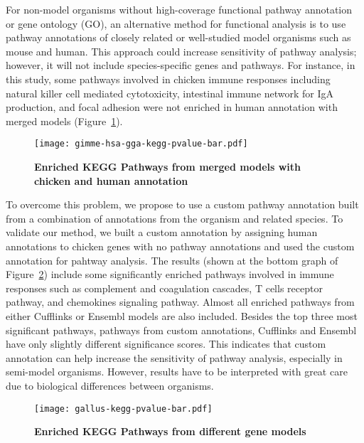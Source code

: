 For non-model organisms without high-coverage functional
pathway annotation or gene ontology (GO), an alternative
method for functional analysis is to use pathway annotations
of closely related or well-studied model organisms such as
mouse and human.  This approach could increase
sensitivity of pathway analysis; however, it will not
include species-specific genes and pathways.  For instance,
in this study, some pathways involved in chicken immune
responses including natural killer cell mediated
cytotoxicity, intestinal immune network for IgA production,
and focal adhesion were not enriched in human annotation
with merged models (Figure~\ref{gimme_hs_ga}).

\begin{figure}[!ht]
    \begin{center}
        \texttt{[image: gimme-hsa-gga-kegg-pvalue-bar.pdf]}
    \end{center}
    \caption{
        \textbf{Enriched KEGG Pathways from merged models with
        chicken and human annotation}
    }
    \label{gimme_hs_ga}
\end{figure}

To overcome this problem, we propose to use a custom pathway
annotation built from a combination of annotations from the
organism and related species.  To validate our method, we
built a custom annotation by assigning human annotations to
chicken genes with no pathway annotations and used the
custom annotation for pahtway analysis.  The results (shown
at the bottom graph of Figure~\ref{KEGG_all}) include some
significantly enriched pathways involved in immune responses
such as complement and coagulation cascades, T cells
receptor pathway, and chemokines signaling pathway. Almost
all enriched pathways from either Cufflinks or Ensembl
models are also included.  Besides the top three most
significant pathways, pathways from custom annotations,
Cufflinks and Ensembl have only slightly different
significance scores.  This indicates that custom annotation
can help increase the sensitivity of pathway analysis,
especially in semi-model organisms.  However, results have
to be interpreted with great care due to biological
differences between organisms.

\begin{figure}[!ht]
    \begin{center}
        \texttt{[image: gallus-kegg-pvalue-bar.pdf]}
    \end{center}
    \caption{
        \textbf{Enriched KEGG Pathways from different gene models}
    }
    \label{KEGG_all}
\end{figure}

